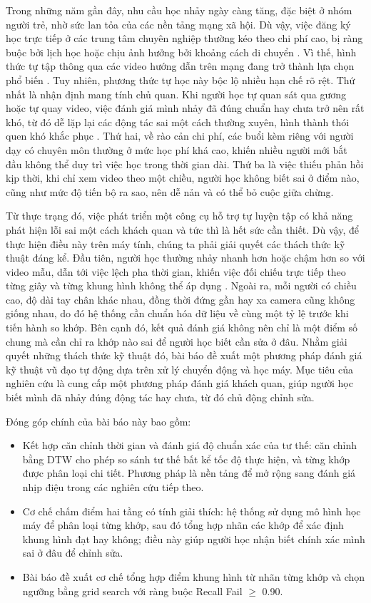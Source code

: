 \documentclass[10pt,conference,a4paper]{IEEEtran}
\begin{document}
Trong những năm gần đây, nhu cầu học nhảy ngày càng tăng, đặc biệt ở nhóm người trẻ, nhờ sức lan tỏa của các nền tảng mạng xã hội. Dù vậy, việc đăng ký học trực tiếp ở các trung tâm chuyên nghiệp thường kéo theo chi phí cao, bị ràng buộc bởi lịch học hoặc chịu ảnh hưởng bởi khoảng cách di chuyển \cite{kang2023dancing}. Vì thế, hình thức tự tập thông qua các video hướng dẫn trên mạng đang trở thành lựa chọn phổ biến \cite{hong2020youtube}. Tuy nhiên, phương thức tự học này bộc lộ nhiều hạn chế rõ rệt. Thứ nhất là nhận định mang tính chủ quan. Khi người học tự quan sát qua gương hoặc tự quay video, việc đánh giá mình nhảy đã đúng chuẩn hay chưa trở nên rất khó, từ đó dễ lặp lại các động tác sai một cách thường xuyên, hình thành thói quen khó khắc phục \cite{Zhou_2021}. Thứ hai, về rào cản chi phí, các buổi kèm riêng với người dạy có chuyên môn thường ở mức học phí khá cao, khiến nhiều người mới bắt đầu không thể duy trì việc học trong thời gian dài. Thứ ba là việc thiếu phản hồi kịp thời, khi chỉ xem video theo một chiều, người học không biết sai ở điểm nào, cũng như mức độ tiến bộ ra sao, nên dễ nản và có thể bỏ cuộc giữa chừng.

Từ thực trạng đó, việc phát triển một công cụ hỗ trợ tự luyện tập có khả năng phát hiện lỗi sai một cách khách quan và tức thì là hết sức cần thiết. Dù vậy, để thực hiện điều này trên máy tính, chúng ta phải giải quyết các thách thức kỹ thuật đáng kể. Đầu tiên, người học thường nhảy nhanh hơn hoặc chậm hơn so với video mẫu, dẫn tới việc lệch pha thời gian, khiến việc đối chiếu trực tiếp theo từng giây và từng khung hình không thể áp dụng \cite{article}. Ngoài ra, mỗi người có chiều cao, độ dài tay chân khác nhau, đồng thời đứng gần hay xa camera cũng không giống nhau, do đó hệ thống cần chuẩn hóa dữ liệu về cùng một tỷ lệ trước khi tiến hành so khớp. Bên cạnh đó, kết quả đánh giá không nên chỉ là một điểm số chung mà cần chỉ ra khớp nào sai để người học biết cần sửa ở đâu. Nhằm giải quyết những thách thức kỹ thuật đó, bài báo đề xuất một phương pháp đánh giá kỹ thuật vũ đạo tự động dựa trên xử lý chuyển động và học máy. Mục tiêu của nghiên cứu là cung cấp một phương pháp đánh giá khách quan, giúp người học biết mình đã nhảy đúng động tác hay chưa, từ đó chủ động chỉnh sửa.

Đóng góp chính của bài báo này bao gồm:
\begin{itemize}
    \item Kết hợp căn chỉnh thời gian và đánh giá độ chuẩn xác của tư thế: căn chỉnh bằng DTW cho phép so sánh tư thế bất kể tốc độ thực hiện, và từng khớp được phân loại chi tiết. Phương pháp là nền tảng để mở rộng sang đánh giá nhịp điệu trong các nghiên cứu tiếp theo.
    \item Cơ chế chấm điểm hai tầng có tính giải thích: hệ thống sử dụng mô hình học máy để phân loại từng khớp, sau đó tổng hợp nhãn các khớp để xác định khung hình đạt hay không; điều này giúp người học nhận biết chính xác mình sai ở đâu để chỉnh sửa.
    \item Bài báo đề xuất cơ chế tổng hợp điểm khung hình từ nhãn từng khớp và chọn ngưỡng bằng grid search với ràng buộc Recall Fail $\geq$ 0.90.
\end{itemize}
\end{document}
